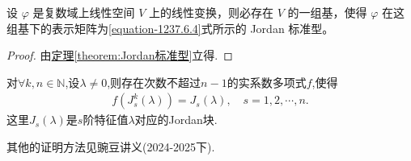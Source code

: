 \documentclass[../../main.tex]{subfiles}%
\begin{document}
\begin{theorem}\label{theorem:线性变换一定有一个Jordan矩阵作为其表示矩阵}
设 $\varphi$ 是复数域上线性空间 $V$ 上的线性变换，则必存在 $V$ 的一组基，使得 $\varphi$ 在这组基下的表示矩阵为\eqref{equation-1237.6.4}式所示的 Jordan 标准型。
\end{theorem}
\begin{proof}

由\hyperref[theorem:Jordan标准型]{定理\ref{theorem:Jordan标准型}}立得.

\end{proof}

\begin{proposition}\label{proposition:特征值为1的Jordan块可由其k次幂的多项式表示}
对$\forall k,n\in \mathbb{N}$,设$\lambda \neq 0$,则存在次数不超过$n-1$的实系数多项式$f$,使得
\begin{align}\label{eq::28947234n9jf0wej0}
f\left( J_{s}^{k}(\lambda) \right) =J_s(\lambda),\quad s=1,2,\cdots ,n.
\end{align}
这里$J_s(\lambda)$是$s$阶特征值$\lambda$对应的Jordan块.
\end{proposition}
\begin{note}
其他的证明方法见豌豆讲义(2024-2025下).
\end{note}
\end{document}

